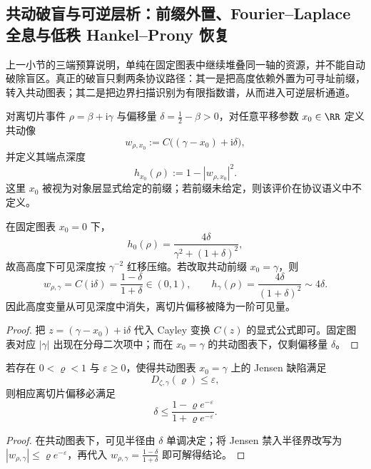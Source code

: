 \subsection{共动破盲与可逆层析：前缀外置、Fourier--Laplace 全息与低秩 Hankel--Prony 恢复}\label{subsec:unit-circle-comoving-tomography}
上一小节的三端预算说明，单纯在固定图表中继续堆叠同一轴的资源，并不能自动破除盲区。真正的破盲只剩两条协议路径：其一是把高度依赖外置为可寻址前缀，转入共动图表；其二是把边界扫描识别为有限指数谱，从而进入可逆层析通道。

\begin{definition}[共动视界图表]\label{def:unit-circle-comoving-chart}
对离切片事件 \(\rho=\beta+\mathrm{i}\gamma\) 与偏移量 \(\delta=\frac12-\beta>0\)，对任意平移参数 \(x_0\in\RR\) 定义共动像
\[
w_{\rho,x_0}:=C\bigl((\gamma-x_0)+\mathrm{i}\delta\bigr),
\]
并定义其端点深度
\[
h_{x_0}(\rho):=1-|w_{\rho,x_0}|^2.
\]
这里 \(x_0\) 被视为对象层显式给定的前缀；若前缀未给定，则该评价在协议语义中不定义。
\end{definition}

\begin{proposition}[固定图表的二次压缩与共动图表的一阶显影]\label{prop:unit-circle-comoving-first-order}
在固定图表 \(x_0=0\) 下，
\[
h_0(\rho)=\frac{4\delta}{\gamma^2+(1+\delta)^2},
\]
故高高度下可见深度按 \(\gamma^{-2}\) 红移压缩。若改取共动前缀 \(x_0=\gamma\)，则
\[
w_{\rho,\gamma}=C(\mathrm{i}\delta)=\frac{1-\delta}{1+\delta}\in(0,1),
\qquad
h_\gamma(\rho)=\frac{4\delta}{(1+\delta)^2}\sim 4\delta.
\]
因此高度变量从可见深度中消失，离切片偏移被降为一阶可见量。
\end{proposition}
\begin{proof}
把 \(z=(\gamma-x_0)+\mathrm{i}\delta\) 代入 Cayley 变换 \(C(z)\) 的显式公式即可。固定图表对应 \(|\gamma|\) 出现在分母二次项中；而在 \(x_0=\gamma\) 的共动图表下，仅剩偏移量 \(\delta\)。
\end{proof}

\begin{proposition}[共动缺陷界导出的偏移上界]\label{prop:unit-circle-comoving-defect-bound}
若存在 \(0<\varrho<1\) 与 \(\varepsilon\ge 0\)，使得共动图表 \(x_0=\gamma\) 上的 Jensen 缺陷满足
\[
D_{\zeta,\gamma}(\varrho)\le \varepsilon,
\]
则相应离切片偏移必满足
\[
\delta\le \frac{1-\varrho e^{-\varepsilon}}{1+\varrho e^{-\varepsilon}}.
\]
\end{proposition}
\begin{proof}
在共动图表下，可见半径由 \(\delta\) 单调决定；将 Jensen 禁入半径界改写为 \(|w_{\rho,\gamma}|\le \varrho e^{-\varepsilon}\)，再代入
\(
w_{\rho,\gamma}=\frac{1-\delta}{1+\delta}
\)
即可解得结论。
\end{proof}

